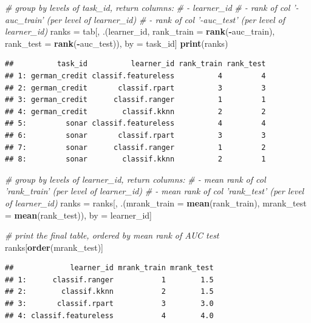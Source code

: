 \documentclass[]{scrbook}
\newenvironment{Shaded}{\begin{snugshade}}{\end{snugshade}}
\newcommand{\CommentTok}[1]{\textcolor[rgb]{0.56,0.35,0.01}{\textit{#1}}}
\newcommand{\DataTypeTok}[1]{\textcolor[rgb]{0.13,0.29,0.53}{#1}}
\newcommand{\KeywordTok}[1]{\textcolor[rgb]{0.13,0.29,0.53}{\textbf{#1}}}
\newcommand{\NormalTok}[1]{#1}
\newcommand{\OperatorTok}[1]{\textcolor[rgb]{0.81,0.36,0.00}{\textbf{#1}}}
\newcommand{\StringTok}[1]{\textcolor[rgb]{0.31,0.60,0.02}{#1}}
\renewenvironment{Shaded} {\begin{snugshade}\small} {\end{snugshade}}
\begin{document}
\begin{Shaded}
\begin{Highlighting}[]
\CommentTok{# group by levels of task_id, return columns:}
\CommentTok{# - learner_id}
\CommentTok{# - rank of col '-auc_train' (per level of learner_id)}
\CommentTok{# - rank of col '-auc_test' (per level of learner_id)}
\NormalTok{ranks =}\StringTok{ }\NormalTok{tab[, .(learner_id, }\DataTypeTok{rank_train =} \KeywordTok{rank}\NormalTok{(}\OperatorTok{-}\NormalTok{auc_train), }\DataTypeTok{rank_test =} \KeywordTok{rank}\NormalTok{(}\OperatorTok{-}\NormalTok{auc_test)), by =}\StringTok{ }\NormalTok{task_id]}
\KeywordTok{print}\NormalTok{(ranks)}
\end{Highlighting}
\end{Shaded}

\begin{verbatim}
##          task_id          learner_id rank_train rank_test
## 1: german_credit classif.featureless          4         4
## 2: german_credit       classif.rpart          3         3
## 3: german_credit      classif.ranger          1         1
## 4: german_credit        classif.kknn          2         2
## 5:         sonar classif.featureless          4         4
## 6:         sonar       classif.rpart          3         3
## 7:         sonar      classif.ranger          1         2
## 8:         sonar        classif.kknn          2         1
\end{verbatim}

\begin{Shaded}
\begin{Highlighting}[]
\CommentTok{# group by levels of learner_id, return columns:}
\CommentTok{# - mean rank of col 'rank_train' (per level of learner_id)}
\CommentTok{# - mean rank of col 'rank_test' (per level of learner_id)}
\NormalTok{ranks =}\StringTok{ }\NormalTok{ranks[, .(}\DataTypeTok{mrank_train =} \KeywordTok{mean}\NormalTok{(rank_train), }\DataTypeTok{mrank_test =} \KeywordTok{mean}\NormalTok{(rank_test)), by =}\StringTok{ }\NormalTok{learner_id]}

\CommentTok{# print the final table, ordered by mean rank of AUC test}
\NormalTok{ranks[}\KeywordTok{order}\NormalTok{(mrank_test)]}
\end{Highlighting}
\end{Shaded}

\begin{verbatim}
##             learner_id mrank_train mrank_test
## 1:      classif.ranger           1        1.5
## 2:        classif.kknn           2        1.5
## 3:       classif.rpart           3        3.0
## 4: classif.featureless           4        4.0
\end{verbatim}
\end{document}
